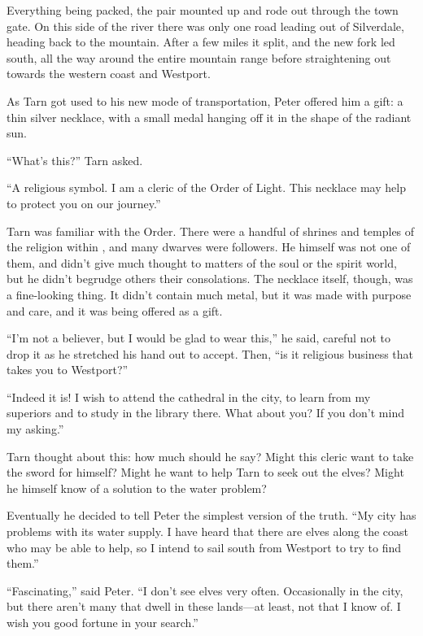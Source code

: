 Everything being packed, the pair mounted up and rode out through the town gate.  On this side of the river there was only one road leading out of Silverdale, heading back to the mountain.  After a few miles it split, and the new fork led south, all the way around the entire mountain range before straightening out towards the western coast and Westport.

As Tarn got used to his new mode of transportation, Peter offered him a gift: a thin silver necklace, with a small medal hanging off it in the shape of the radiant sun.

``What's this?'' Tarn asked.

``A religious symbol.  I am a cleric of the Order of Light.  This necklace may help to protect you on our journey.''

Tarn was familiar with the Order.  There were a handful of shrines and temples of the religion within \korbarthrond, and many dwarves were followers.  He himself was not one of them, and didn't give much thought to matters of the soul or the spirit world, but he didn't begrudge others their consolations.  The necklace itself, though, was a fine-looking thing.  It didn't contain much metal, but it was made with purpose and care, and it was being offered as a gift.

``I'm not a believer, but I would be glad to wear this,'' he said, careful not to drop it as he stretched his hand out to accept.  Then, ``is it religious business that takes you to Westport?''

``Indeed it is!  I wish to attend the cathedral in the city, to learn from my superiors and to study in the library there.  What about you?  If you don't mind my asking.''

Tarn thought about this: how much should he say?  Might this cleric want to take the sword for himself?  Might he want to help Tarn to seek out the elves?  Might he himself know of a solution to the water problem?

Eventually he decided to tell Peter the simplest version of the truth.  ``My city has problems with its water supply.  I have heard that there are elves along the coast who may be able to help, so I intend to sail south from Westport to try to find them.''

``Fascinating,'' said Peter.  ``I don't see elves very often.  Occasionally in the city, but there aren't many that dwell in these lands---at least, not that I know of.  I wish you good fortune in your search.''

